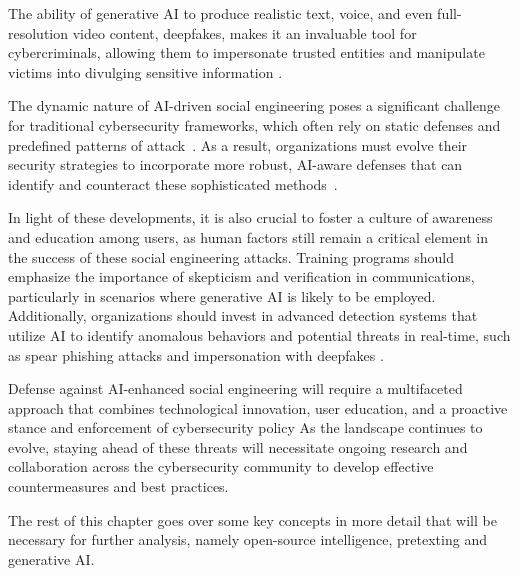 The ability of generative AI to produce realistic text, voice, and even full-resolution video content, deepfakes, makes it an invaluable tool for cybercriminals, allowing them to impersonate trusted entities and manipulate victims into divulging sensitive information \citep{mirskyTheCreationAndDetectionOfDeepfakes2021}.

The dynamic nature of AI-driven social engineering poses a significant challenge for traditional cybersecurity frameworks, which often rely on static defenses and predefined patterns of attack~\citep{tsinganosTowardsAnAutomatedRecognitionSystem2018}. As a result, organizations must evolve their security strategies to incorporate more robust, AI-aware defenses that can identify and counteract these sophisticated methods~\citep{mirskyTheCreationAndDetectionOfDeepfakes2021}.

In light of these developments, it is also crucial to foster a culture of awareness and education among users, as human factors still remain a critical element in the success of these social engineering attacks. Training programs should emphasize the importance of skepticism and verification in communications, particularly in scenarios where generative AI is likely to be employed. Additionally, organizations should invest in advanced detection systems that utilize AI to identify anomalous behaviors and potential threats in real-time, such as spear phishing attacks \citep{fakhouriAIDrivenSolutionsForSocialEngineeringAttacks2024} and impersonation with deepfakes \citep{mirskyTheCreationAndDetectionOfDeepfakes2021}.

Defense against AI-enhanced social engineering will require a multifaceted approach that combines technological innovation, user education, and a proactive stance and enforcement of cybersecurity policy \citep{blauthArtificialIntelligenceCrimeOverviewMaliciousUseAbuse2022} As the landscape continues to evolve, staying ahead of these threats will necessitate ongoing research and collaboration across the cybersecurity community to develop effective countermeasures and best practices.

The rest of this chapter goes over some key concepts in more detail that will be necessary for further analysis, namely open-source intelligence, pretexting and generative AI.







